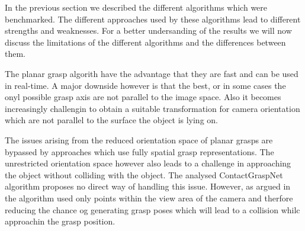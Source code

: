 
In the previous section we described the different algorithms which were benchmarked.
The different approaches used by these algorithms lead to different strengths and weaknesses.
For a better undersanding of the results we will now discuss the limitations of the different algorithms and the differences between them.

The planar grasp algorith have the advantage that they are fast and can be used in real-time.
A major downside however is that the best, or in some cases the onyl possible grasp axis are not parallel to the image space.
Also it becomes increasingly challengin to obtain a suitable transformation for camera orientation which are not parallel to the surface the object is lying on.

The issues arising from the reduced orientation space of planar grasps are bypassed by approaches which use fully spatial grasp representations.
The unrestricted orientation space however also leads to a challenge in approaching the object without colliding with the object.
The analysed ContactGraspNet algorithm proposes no direct way of handling this issue.
However, as argued in \cite{} the algorithm used only points within the view area of the camera and therfore reducing the chance og generating grasp poses which will
lead to a collision whilc approachin the grasp position.



